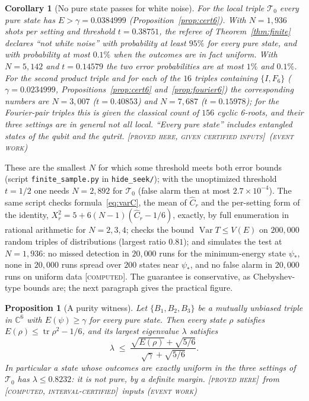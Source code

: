 \documentclass[11pt]{article}
\newcommand{\C}{\mathbb{C}}
\newcommand{\Tz}{\mathcal{T}_0}          %
\newcommand{\E}{E}                       %
\newcommand{\st}[1]{\textsc{[#1]}}
\newcommand{\stproved}{\st{proved here}}
\newcommand{\stgiven}{\st{proved here, given certified inputs}}
\newcommand{\stcert}{\st{computed, interval-certified}}
\newcommand{\stcomp}{\st{computed}}
\newcommand{\event}{\textsc{(event work)}}
\newtheorem{proposition}[theorem]{Proposition}
\newtheorem{corollary}[theorem]{Corollary}
\theoremstyle{definition}
\theoremstyle{remark}
\begin{document}
\begin{corollary}[No pure state passes for white noise]\label{cor:finite}
For the local triple $\Tz$ every pure state has $\E>\gamma=0.0384999$ (Proposition~\ref{prop:cert6}).
With $N=1{,}936$ shots per setting and threshold $t=0.38751$, the referee of Theorem~\ref{thm:finite} declares
``not white noise'' with probability at least $95\%$ for \emph{every} pure state, and with probability at most
$0.1\%$ when the outcomes are in fact uniform. With $N=5{,}142$ and $t=0.14579$ the two error probabilities are at
most $1\%$ and $0.1\%$. For the second product triple and for each of the $16$ triples containing $\{I,F_6\}$
($\gamma=0.0234999$, Propositions~\ref{prop:cert6} and~\ref{prop:fourier6}) the corresponding numbers are
$N=3{,}007$ ($t=0.40853$) and $N=7{,}687$ ($t=0.15978$); for the Fourier-pair triples this is given the classical
count of $156$ cyclic 6-roots, and their three settings are in general not all local. ``Every pure state''
includes entangled states of the qubit and the qutrit. \stgiven\ \event
\end{corollary}

\noindent These are the smallest $N$ for which some threshold meets both error bounds (script
\texttt{finite\_sample.py} in \texttt{hide\_seek/}); with the unoptimized threshold $t=1/2$ one needs $N=2{,}892$ for $\Tz$
(false alarm then at most $2.7\times10^{-4}$). The same script checks formula~\eqref{eq:varC}, the mean of $\widehat C_r$ and the
per-setting form of the identity, $X_r^2=5+6(N-1)(\widehat C_r-1/6)$, exactly, by full enumeration in rational
arithmetic for $N=2,3,4$; checks the bound
$\operatorname{Var}T\le V(\E)$ on $200{,}000$ random triples of distributions (largest ratio $0.81$); and simulates
the test at $N=1{,}936$: no missed detection in $20{,}000$ runs for the minimum-energy state $\psi_\ast$, none in
$20{,}000$ runs spread over $200$ states near $\psi_\ast$, and no false alarm in $20{,}000$ runs on uniform data
\stcomp. The guarantee is conservative, as Chebyshev-type bounds are; the next paragraph gives the practical figure.

\begin{proposition}[A purity witness]\label{prop:purity}
Let $\{B_1,B_2,B_3\}$ be a mutually unbiased triple in $\C^6$ with $\E(\psi)\ge\gamma$ for every pure state. Then
every state $\rho$ satisfies $\E(\rho)\le\operatorname{tr}\rho^2-1/6$, and its largest eigenvalue $\lambda$
satisfies
\[
  \lambda\;\le\;\frac{\sqrt{\E(\rho)}+\sqrt{5/6}}{\sqrt{\gamma}+\sqrt{5/6}} .
\]
In particular a state whose outcomes are exactly uniform in the three settings of $\Tz$ has
$\lambda\le0.8232$: it is not pure, by a definite margin. \stproved\ from \stcert\ inputs \event
\end{proposition}
\end{document}
